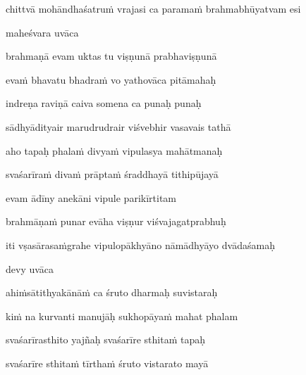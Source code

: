 \nemslokad 
chittvā mohāndhaśatru\.m vrajasi ca parama\.m brahmabhūyatvam esi \veg\dontdisplaylinenum

\vers

maheśvara uvāca~{\dandab}\dontdisplaylinenum 

brahmaṇā evam uktas tu viṣṇunā prabhaviṣṇunā\thinspace{\danda} \dontdisplaylinenum

eva\.m bhavatu bhadra\.m vo yathovāca pitāmahaḥ \veg\dontdisplaylinenum

indreṇa raviṇā caiva somena ca punaḥ punaḥ\thinspace{\dandab} \dontdisplaylinenum

sādhyādityair marudrudrair viśvebhir vasavais tathā \veg\dontdisplaylinenum

aho tapaḥ phala\.m divya\.m vipulasya mahātmanaḥ\thinspace{\dandab} \dontdisplaylinenum

svaśarīra\.m diva\.m prāpta\.m śraddhayā tithipūjayā \veg\dontdisplaylinenum

evam ādīny anekāni vipule parikīrtitam\thinspace{\dandab} \dontdisplaylinenum

brahmāṇa\.m punar evāha viṣṇur viśvajagatprabhuḥ \veg\dontdisplaylinenum


\jump
\begin{center}
\ketdanda iti vṣasārasa\.mgrahe vipulopākhyāno nāmādhyāyo dvādaśamaḥ\ketdanda
\end{center}
\dontdisplaylinenum\vers 

\vers
\bekveg\szamveg\vfill\phpspagebreak\szam\bek{}
\thispagestyle{empty}



\jump\jump 
devy uvāca~{\dandab}\dontdisplaylinenum 

ahi\.msātithyakānā\.m ca śruto dharmaḥ suvistaraḥ\thinspace{\danda} \dontdisplaylinenum

ki\.m na kurvanti manujāḥ sukhopāya\.m mahat phalam \veg\dontdisplaylinenum

svaśarīrasthito yajñaḥ svaśarīre sthita\.m tapaḥ\thinspace{\dandab} \dontdisplaylinenum

svaśarīre sthita\.m tīrtha\.m śruto vistarato mayā \veg\dontdisplaylinenum

